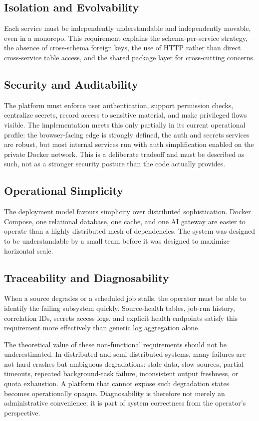 \subsection{Isolation and Evolvability}
Each service must be independently understandable and independently movable, even in a monorepo. This requirement explains the schema-per-service strategy, the absence of cross-schema foreign keys, the use of HTTP rather than direct cross-service table access, and the shared package layer for cross-cutting concerns.

\subsection{Security and Auditability}
The platform must enforce user authentication, support permission checks, centralize secrets, record access to sensitive material, and make privileged flows visible. The implementation meets this only partially in its current operational profile: the browser-facing edge is strongly defined, the auth and secrets services are robust, but most internal services run with auth simplification enabled on the private Docker network. This is a deliberate tradeoff and must be described as such, not as a stronger security posture than the code actually provides.

\subsection{Operational Simplicity}
The deployment model favours simplicity over distributed sophistication. Docker Compose, one relational database, one cache, and one AI gateway are easier to operate than a highly distributed mesh of dependencies. The system was designed to be understandable by a small team before it was designed to maximize horizontal scale.

\subsection{Traceability and Diagnosability}
When a source degrades or a scheduled job stalls, the operator must be able to identify the failing subsystem quickly. Source-health tables, job-run history, correlation IDs, secrets access logs, and explicit health endpoints satisfy this requirement more effectively than generic log aggregation alone.

The theoretical value of these non-functional requirements should not be underestimated. In distributed and semi-distributed systems, many failures are not hard crashes but ambiguous degradations: stale data, slow sources, partial timeouts, repeated background-task failure, inconsistent output freshness, or quota exhaustion. A platform that cannot expose such degradation states becomes operationally opaque. Diagnosability is therefore not merely an administrative convenience; it is part of system correctness from the operator's perspective.

